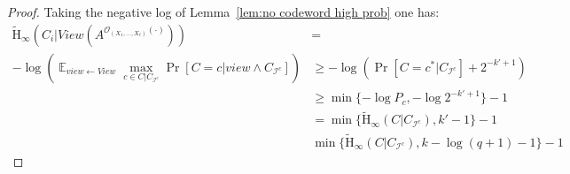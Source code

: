 \documentclass[11pt]{article}
\newcommand{\lemref}[1]{\mbox{Lemma~\ref{#1}}}
\DeclareMathOperator*{\expe}{\mathbb{E}}
\newcommand{\hillrlx}{\ensuremath{\mathtt{HILL\mhyphen rlx}}\xspace}
\newcommand{\poly}{\ensuremath{\mathtt{poly}}\xspace}
\newcommand{\ngl}{\ensuremath{\mathtt{ngl}}\xspace}
\newcommand{\Hoo}{\mathrm{H}_\infty}
\newcommand{\Hav}{\tilde{\mathrm{H}}_\infty}
\newtheorem{lemma}[theorem]{Lemma}
\begin{document}
\begin{proof}
Taking the negative log of \lemref{lem:no codeword high prob} one has:
\begin{align*}
\Hav(C_i |  View(A^{\mathcal{O}_{(X_1,..., X_\ell)}(\cdot)}))
 &= \\
 -\log \left(\expe_{view \leftarrow View}\max_{c\in C|C_{\mathcal{I}^c}}\Pr[C =c | view \wedge C_{\mathcal{I}^c} ]  \right) &\geq -\log (\Pr[C=c^* | C_{\mathcal{I}^c} ]+ 2^{-k'+1}) \\
 &\geq \min \{-\log P_c, -\log 2^{-k'+1}\} -1\\
 &= \min \{ \Hav(C | C_{\mathcal{I}^c}), k'-1\}-1 \\
 & \min \{ \Hav(C | C_{\mathcal{I}^c}), k-\log(q+1)-1\}-1 
\end{align*}
\end{proof}
\end{document}
